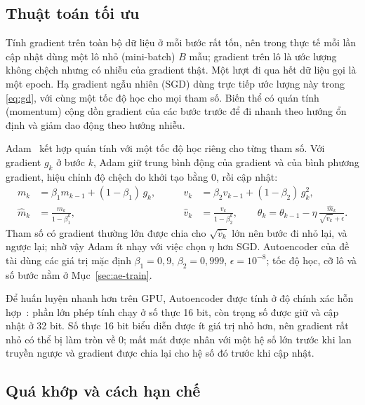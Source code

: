 \subsection{Thuật toán tối ưu}

Tính gradient trên toàn bộ dữ liệu ở mỗi bước rất tốn, nên trong thực tế mỗi lần cập nhật dùng một lô nhỏ
(mini-batch) $B$ mẫu; gradient trên lô là ước lượng không chệch nhưng có nhiễu của gradient thật. Một lượt đi qua hết
dữ liệu gọi là một epoch. Hạ gradient ngẫu nhiên (SGD) dùng trực tiếp ước lượng này trong \eqref{eq:gd}, với cùng một
tốc độ học cho mọi tham số. Biến thể có quán tính (momentum) cộng dồn gradient của các bước trước để đi nhanh theo
hướng ổn định và giảm dao động theo hướng nhiễu.

Adam~\cite{kingmaAdamMethodStochastic2015} kết hợp quán tính với một tốc độ học riêng cho từng tham số. Với gradient
$g_k$ ở bước $k$, Adam giữ trung bình động của gradient và của bình phương gradient, hiệu chỉnh độ chệch do khởi tạo
bằng 0, rồi cập nhật:
\begin{equation}
  \begin{aligned}
    m_k &= \beta_1 m_{k-1} + (1-\beta_1)\, g_k, &\qquad
    v_k &= \beta_2 v_{k-1} + (1-\beta_2)\, g_k^2, \\
    \hat{m}_k &= \frac{m_k}{1-\beta_1^{k}}, &\qquad
    \hat{v}_k &= \frac{v_k}{1-\beta_2^{k}}, \qquad
    \theta_{k} = \theta_{k-1} - \eta\, \frac{\hat{m}_k}{\sqrt{\hat{v}_k} + \epsilon} .
  \end{aligned}
  \label{eq:adam}
\end{equation}
Tham số có gradient thường lớn được chia cho $\sqrt{\hat{v}_k}$ lớn nên bước đi nhỏ lại, và ngược lại; nhờ vậy Adam ít
nhạy với việc chọn $\eta$ hơn SGD. Autoencoder của đề tài dùng các giá trị mặc định $\beta_1 = 0{,}9$, $\beta_2 =
0{,}999$, $\epsilon = 10^{-8}$; tốc độ học, cỡ lô và số bước nằm ở Mục~\ref{sec:ae-train}.

Để huấn luyện nhanh hơn trên GPU, Autoencoder được tính ở độ chính xác hỗn hợp~\cite{micikeviciusMixedPrecisionTraining2018}:
phần lớn phép tính chạy ở số thực 16 bit, còn trọng số được giữ và cập nhật ở 32 bit. Số thực 16 bit biểu diễn được
ít giá trị nhỏ hơn, nên gradient rất nhỏ có thể bị làm tròn về 0; mất mát được nhân với một hệ số lớn trước khi lan
truyền ngược và gradient được chia lại cho hệ số đó trước khi cập nhật.

\subsection{Quá khớp và cách hạn chế}

